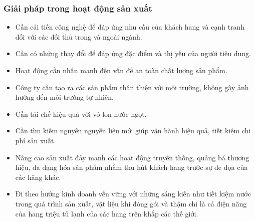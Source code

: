\documentclass{article}
\begin{document}
    \subsubsection{Giải pháp trong hoạt động sản xuất}
        \begin{itemize}
            \item Cần cải tiến công nghệ để đáp ứng nhu cầu của khách hang và cạnh tranh đối với các đối thủ trong và ngoài ngành.
            \item Cần có những thay đổi để đáp ứng đặc điểm và thị yếu của người tiêu dung.
            \item Hoạt động cần nhấn mạnh đến vấn đề an toàn chất lượng sản phẩm.
            \item Công ty cần tạo ra các sản phẩm thân thiện với môi trường, không gây ảnh hướng đến môi trường tự nhiên.
            \item Cần tái chế hiệu quả với vỏ lon nước ngọt.
            \item Cần tìm kiếm nguyên nguyễn liệu mới giúp vận hành hiệu quả, tiết kiệm chi phí sản xuất.
            \item Nâng cao sản xuất đảy mạnh các hoạt động truyền thống, quảng bá thương hiệu, đa dạng hóa sản phẩm nhằm thu hút khách hang trước sự đe dọa của các hãng khác.
            \item Đi theo hướng kinh doanh vền vững với những sáng kiến như tiết kiệm nước trong quá trình sản xuất, vật liệu khi đóng gói và thậm chí là cả điện năng của hang triệu tủ lạnh của các hang trên khắp các thế giới.
        \end{itemize}
\end{document}
